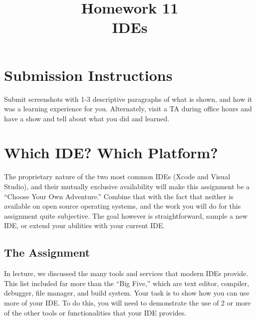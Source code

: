 \documentclass{article}
\begin{document}
\fancyfoot[C]{\color{gray} \thepage~/~\pageref*{LastPage}}
\pagestyle{fancyplain}

\title{\textbf{Homework 11\\IDEs}}
\author{\textbf{\color{red}{Due: Wednesday, November 28th, 11:59PM (Hard Deadline)}}}
\date{}
\maketitle


\section*{Submission Instructions}
Submit screenshots with 1-3 descriptive paragraphs of what is shown, and how it
was a learning experience for you. Alternately, visit a TA during office hours
and have a show and tell about what you did and learned.


\section{Which IDE? Which Platform?}

The proprietary nature of the two most common IDEs (Xcode and Visual Studio), and their mutually exclusive availability will make this assignment be a
``Choose Your Own Adventure.'' Combine that with the fact that neither is
available on open source operating systems, and the work you will do for this
assignment quite subjective. The goal however is straightforward, sample a new
IDE, or extend your abilities with your current IDE.

\subsection*{The Assignment}
In lecture, we discussed the many tools and services that modern IDEs provide.
This list included far more than the ``Big Five,'' which are text editor,
compiler, debugger, file manager, and build system. Your task is to show how
you can use more of your IDE. To do this, you will need to demonstrate the use
of 2 or more of the other tools or functionalities that your IDE provides.
\end{document}
